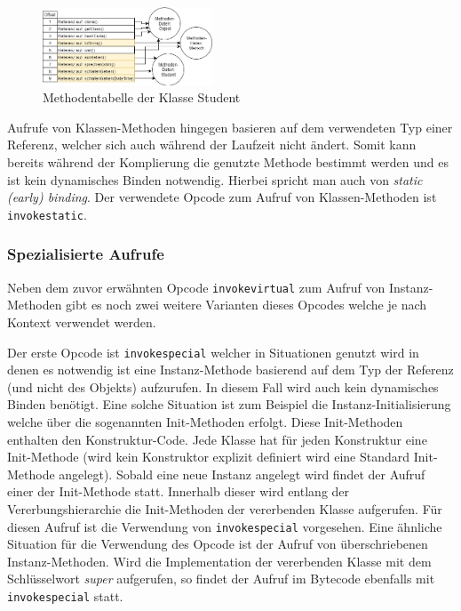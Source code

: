 \documentclass[conference]{IEEEtran}
\begin{document}
\begin{figure}[htbp] 
  \centering
     \includegraphics[width=0.45\textwidth]{Grafiken/MethodenTabelleAusHierarchie.png}
  \caption{Methodentabelle der Klasse Student}
  \label{fig:methodenTabelleUmlHierachie}
\end{figure}

Aufrufe von Klassen-Methoden hingegen basieren auf dem verwendeten Typ einer Referenz, welcher sich auch während der Laufzeit nicht ändert. Somit kann bereits während der Komplierung die genutzte Methode bestimmt werden und es ist kein dynamisches Binden notwendig. Hierbei spricht man auch von \textit{static (early) binding}. Der verwendete Opcode zum Aufruf von Klassen-Methoden ist \verb|invokestatic|. \cite{Venners.1997}

\subsubsection{Spezialisierte Aufrufe}
Neben dem zuvor erwähnten Opcode \verb|invokevirtual| zum Aufruf von Instanz-Methoden gibt es noch zwei weitere Varianten dieses Opcodes welche je nach Kontext verwendet werden. 

Der erste Opcode ist \verb|invokespecial| welcher in Situationen genutzt wird in denen es notwendig ist eine Instanz-Methode basierend auf dem Typ der Referenz (und nicht des Objekts) aufzurufen. In diesem Fall wird auch kein dynamisches Binden benötigt. Eine solche Situation ist zum Beispiel die Instanz-Initialisierung welche über die sogenannten Init-Methoden erfolgt. Diese Init-Methoden enthalten den Konstruktur-Code. Jede Klasse hat für jeden Konstruktur eine Init-Methode (wird kein Konstruktor explizit definiert wird eine Standard Init-Methode angelegt). Sobald eine neue Instanz angelegt wird findet der Aufruf einer der Init-Methode statt. Innerhalb dieser wird entlang der Vererbungshierarchie die Init-Methoden der vererbenden Klasse aufgerufen. Für diesen Aufruf ist die Verwendung von \verb|invokespecial| vorgesehen. Eine ähnliche Situation für die Verwendung des Opcode ist der Aufruf von überschriebenen Instanz-Methoden. Wird die Implementation der vererbenden Klasse mit dem Schlüsselwort \textit{super} aufgerufen, so findet der Aufruf im Bytecode ebenfalls mit \verb|invokespecial| statt.
\end{document}
